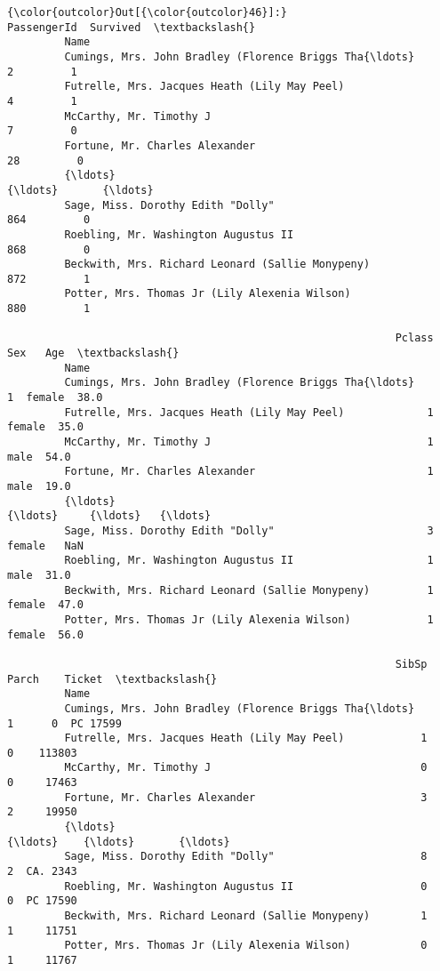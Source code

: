 \documentclass[11pt]{article}
\begin{document}
\begin{Verbatim}[commandchars=\\\{\}]
{\color{outcolor}Out[{\color{outcolor}46}]:}                                                     PassengerId  Survived  \textbackslash{}
         Name                                                                        
         Cumings, Mrs. John Bradley (Florence Briggs Tha{\ldots}            2         1   
         Futrelle, Mrs. Jacques Heath (Lily May Peel)                  4         1   
         McCarthy, Mr. Timothy J                                       7         0   
         Fortune, Mr. Charles Alexander                               28         0   
         {\ldots}                                                         {\ldots}       {\ldots}   
         Sage, Miss. Dorothy Edith "Dolly"                           864         0   
         Roebling, Mr. Washington Augustus II                        868         0   
         Beckwith, Mrs. Richard Leonard (Sallie Monypeny)            872         1   
         Potter, Mrs. Thomas Jr (Lily Alexenia Wilson)               880         1   
         
                                                             Pclass     Sex   Age  \textbackslash{}
         Name                                                                       
         Cumings, Mrs. John Bradley (Florence Briggs Tha{\ldots}       1  female  38.0   
         Futrelle, Mrs. Jacques Heath (Lily May Peel)             1  female  35.0   
         McCarthy, Mr. Timothy J                                  1    male  54.0   
         Fortune, Mr. Charles Alexander                           1    male  19.0   
         {\ldots}                                                    {\ldots}     {\ldots}   {\ldots}   
         Sage, Miss. Dorothy Edith "Dolly"                        3  female   NaN   
         Roebling, Mr. Washington Augustus II                     1    male  31.0   
         Beckwith, Mrs. Richard Leonard (Sallie Monypeny)         1  female  47.0   
         Potter, Mrs. Thomas Jr (Lily Alexenia Wilson)            1  female  56.0   
         
                                                             SibSp  Parch    Ticket  \textbackslash{}
         Name                                                                         
         Cumings, Mrs. John Bradley (Florence Briggs Tha{\ldots}      1      0  PC 17599   
         Futrelle, Mrs. Jacques Heath (Lily May Peel)            1      0    113803   
         McCarthy, Mr. Timothy J                                 0      0     17463   
         Fortune, Mr. Charles Alexander                          3      2     19950   
         {\ldots}                                                   {\ldots}    {\ldots}       {\ldots}   
         Sage, Miss. Dorothy Edith "Dolly"                       8      2  CA. 2343   
         Roebling, Mr. Washington Augustus II                    0      0  PC 17590   
         Beckwith, Mrs. Richard Leonard (Sallie Monypeny)        1      1     11751   
         Potter, Mrs. Thomas Jr (Lily Alexenia Wilson)           0      1     11767   
         

\end{Verbatim}
\end{document}
